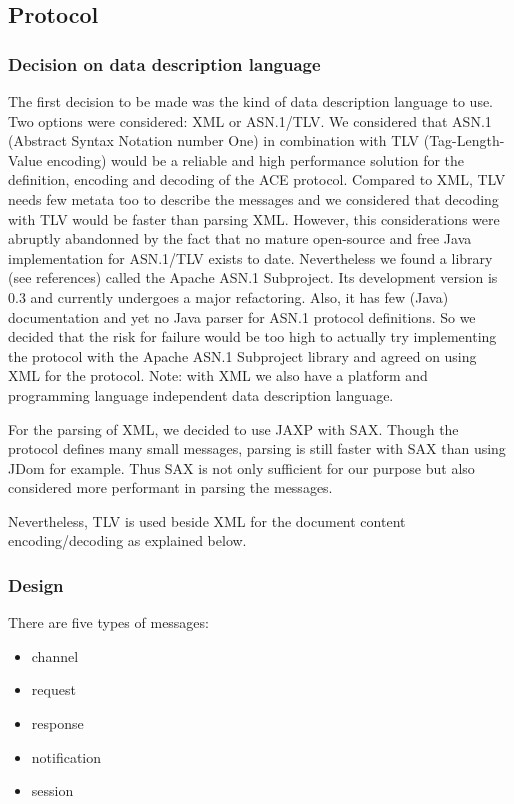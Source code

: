 \subsection{Protocol}
\label{chapter:network.communication.protocol}
\subsubsection{Decision on data description language}
The first decision to be made was the kind of data description language to use. Two options were considered: XML or ASN.1/TLV. We considered that ASN.1 (Abstract Syntax Notation number One) in combination with TLV (Tag-Length-Value encoding) would be a reliable and high performance solution for the definition, encoding and decoding of the ACE protocol. Compared to XML, TLV needs few metata too to describe the messages and we considered that decoding with TLV would be faster than parsing XML. However, this considerations were abruptly abandonned by the fact that no mature open-source and free Java implementation for ASN.1/TLV exists to date. Nevertheless we found a library (see references) called the Apache ASN.1 Subproject. Its development version is 0.3 and currently undergoes a major refactoring. Also, it has few (Java) documentation and yet no Java parser for ASN.1 protocol definitions. So we decided that the risk for failure would be too high to actually try implementing the protocol with the Apache ASN.1 Subproject library and agreed on using XML for the protocol. Note: with XML we also have a platform and programming language independent data description language.

For the parsing of XML, we decided to use JAXP with SAX. Though the protocol defines many small messages, parsing is still faster with SAX than using JDom for example. Thus SAX is not only sufficient for our purpose but also considered more performant in parsing the messages.

Nevertheless, TLV is used beside XML for the document content encoding/decoding as explained below.

\subsubsection{Design}
There are five types of messages:

\begin{itemize}
\item channel
\item request
\item response
\item notification
\item session
\end{itemize}

